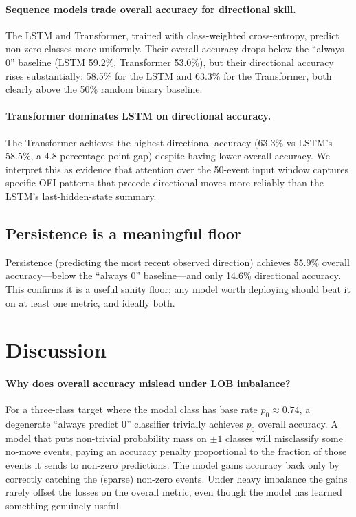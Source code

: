 \documentclass[11pt]{article}
\begin{document}
\paragraph{Sequence models trade overall accuracy for directional skill.}
The LSTM and Transformer, trained with class-weighted cross-entropy,
predict non-zero classes more uniformly. Their overall accuracy drops
below the ``always 0'' baseline (LSTM 59.2\%, Transformer 53.0\%), but
their directional accuracy rises substantially: 58.5\% for the LSTM
and 63.3\% for the Transformer, both clearly above the 50\% random
binary baseline.

\paragraph{Transformer dominates LSTM on directional accuracy.}
The Transformer achieves the highest directional accuracy (63.3\%
vs LSTM's 58.5\%, a 4.8 percentage-point gap) despite having lower
overall accuracy. We interpret this as evidence that attention over
the 50-event input window captures specific OFI patterns that
precede directional moves more reliably than the LSTM's
last-hidden-state summary.

\subsection{Persistence is a meaningful floor}

Persistence (predicting the most recent observed direction) achieves
55.9\% overall accuracy---below the ``always 0'' baseline---and only
14.6\% directional accuracy. This confirms it is a useful sanity
floor: any model worth deploying should beat it on at least one
metric, and ideally both.

\section{Discussion}
\label{sec:discussion}

\paragraph{Why does overall accuracy mislead under LOB imbalance?}
For a three-class target where the modal class has base rate
\(p_0 \approx 0.74\), a degenerate ``always predict \(0\)'' classifier
trivially achieves \(p_0\) overall accuracy. A model that puts
non-trivial probability mass on \(\pm 1\) classes will misclassify
some no-move events, paying an accuracy penalty proportional to the
fraction of those events it sends to non-zero predictions. The model
gains accuracy back only by correctly catching the (sparse)
non-zero events. Under heavy imbalance the gains rarely offset the
losses on the overall metric, even though the model has learned
something genuinely useful.
\end{document}

